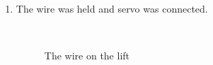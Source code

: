 \begin{enumerate}
\begin{enumerate}
		\item The wire was held and servo was connected.
		\begin{figure}[H]
			\begin{minipage}[h]{0.2\linewidth}
				\center  
			\end{minipage}
			\begin{minipage}[h]{0.6\linewidth}
				\caption{The wire on the lift}
			\end{minipage}
		\end{figure}
		

\end{enumerate}
\end{enumerate}
